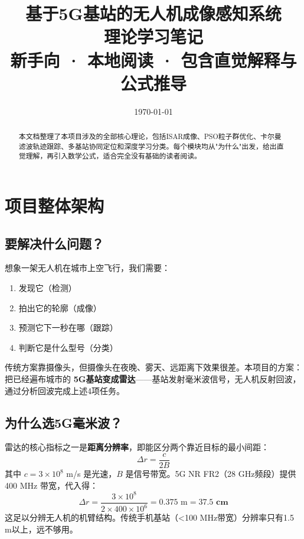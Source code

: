 \documentclass[12pt, a4paper]{article}
\title{
  \vspace{-1cm}
  {\Large\bfseries 基于5G基站的无人机成像感知系统}\\[0.5em]
  {\large 理论学习笔记}\\[0.5em]
  {\normalsize\color{gray} 新手向 · 本地阅读 · 包含直觉解释与公式推导}
}
\author{}
\date{\today}
\begin{document}

\maketitle
\thispagestyle{fancy}

\begin{abstract}
本文档整理了本项目涉及的全部核心理论，包括ISAR成像、PSO粒子群优化、卡尔曼滤波轨迹跟踪、多基站协同定位和深度学习分类。每个模块均从"为什么"出发，给出直觉理解，再引入数学公式，适合完全没有基础的读者阅读。
\end{abstract}

\tableofcontents
\newpage

\section{项目整体架构}

\subsection{要解决什么问题？}

想象一架无人机在城市上空飞行，我们需要：
\begin{enumerate}
  \item 发现它（检测）
  \item 拍出它的轮廓（成像）
  \item 预测它下一秒在哪（跟踪）
  \item 判断它是什么型号（分类）
\end{enumerate}

传统方案靠摄像头，但摄像头在夜晚、雾天、远距离下效果很差。本项目的方案：把已经遍布城市的 \textbf{5G基站变成雷达}——基站发射毫米波信号，无人机反射回波，通过分析回波完成上述4项任务。

\subsection{为什么选5G毫米波？}

雷达的核心指标之一是\textbf{距离分辨率}，即能区分两个靠近目标的最小间距：
\begin{equation}
  \Delta r = \frac{c}{2B}
\end{equation}
其中 $c = 3\times10^8$ m/s 是光速，$B$ 是信号带宽。5G NR FR2（28 GHz频段）提供 400 MHz 带宽，代入得：
\begin{equation}
  \Delta r = \frac{3\times10^8}{2 \times 400\times10^6} = 0.375 \text{ m} = \mathbf{37.5 \text{ cm}}
\end{equation}
这足以分辨无人机的机臂结构。传统手机基站（<100 MHz带宽）分辨率只有1.5 m以上，远不够用。
\end{document}
